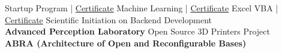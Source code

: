 
Startup Program \hfill| {\color{linkBlue} \href{https://e-certificado.com/login/visualizar?c=664024A5B7D718B4639950}{Certificate}}
Machine Learning \hfill|  {\color{linkBlue} \href{https://cursos.alura.com.br/degree/certificate/98f57b77-ffe3-4062-b69c-7259b0fd74c6}{Certificate}}
Excel VBA \hfill| {\color{linkBlue} \href{https://cursos.alura.com.br/degree/certificate/68d6f5b3-3a07-4fac-9f6b-f42f04e131ca}{Certificate}}
Scientific Initiation on Backend Development\\\textbf{Advanced Perception Laboratory}
Open Source 3D Printers Project\\\textbf{ABRA (Architecture of Open and Reconfigurable Bases)}

